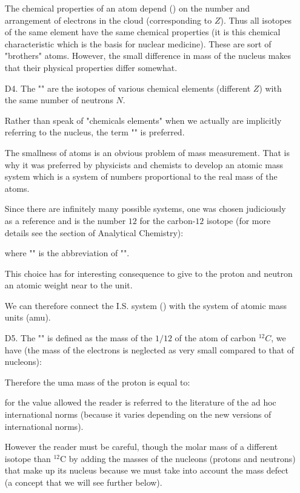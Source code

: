 \begin{enumerate}
		The chemical properties of an atom depend () on the number and arrangement of electrons in the cloud (corresponding to $Z$). Thus all isotopes of the same element have the same chemical properties (it is this chemical characteristic which is the basis for nuclear medicine). These are sort of "brothers" atoms. However, the small difference in mass of the nucleus makes that their physical properties differ somewhat.
		
		\item[D4.] The "" are the isotopes of various chemical elements (different $Z$) with the same number of neutrons $N$.
		
		 Rather than speak of "chemicals elements" when we actually are implicitly referring to the nucleus, the term "" is preferred.
		 
		 The smallness of atoms is an obvious problem of mass measurement. That is why it was preferred by physicists and chemists to develop an atomic mass system which is a system of numbers proportional to the real mass of the atoms.
		 
		 Since there are infinitely many possible systems, one was chosen judiciously as a reference and is the number $12$ for the carbon-$12$ isotope (for more details see the section of Analytical Chemistry):
		 
		where "" is the abbreviation of "".
		
		This choice has for interesting consequence to give to the proton and neutron an atomic weight near to the unit.
		
		We can therefore connect the I.S. system () with the system of atomic mass units (amu).
		
		\item[D5.] The "" is defined as the mass of the $1/12$ of the atom of carbon ${}^{12}C$, we have (the mass of the electrons is neglected as very small compared to that of nucleons):
		
		Therefore the uma mass of the proton is equal to:
		
		 for the value allowed the reader is referred to the literature of the ad hoc international norms (because it varies depending on the new versions of international norms).
		 
		However the reader must be careful, though the molar mass of a different isotope than ${}^{12}\mathrm{C}$ by adding the masses of the nucleons (protons and neutrons) that make up its nucleus because we must take into account the mass defect (a concept that we will see further below).
	

\end{enumerate}
